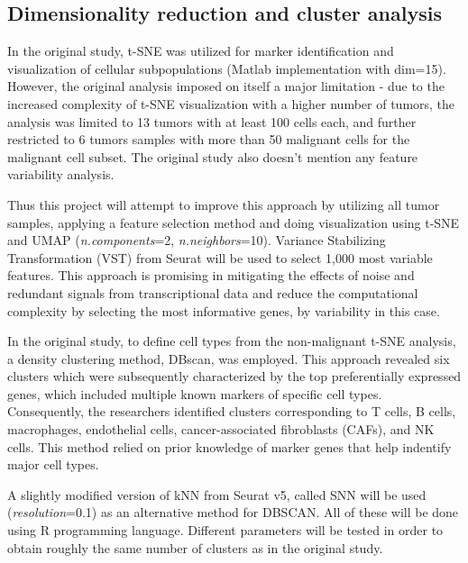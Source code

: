 \documentclass[11pt]{article}
\begin{document}
\subsection{Dimensionality reduction and cluster analysis}
\begin{multicols}{2}
    \noindent
    In the original study, t-SNE was utilized for marker identification and visualization of cellular subpopulations (Matlab implementation with dim=15). However, the original analysis imposed on itself a major limitation - due to the increased complexity of t-SNE visualization with a higher number of tumors, the analysis was limited to 13 tumors with at least 100 cells each, and further restricted to 6 tumors samples with more than 50 malignant cells for the malignant cell subset. The original study also doesn't mention any feature variability analysis.

    Thus this project will attempt to improve this approach by utilizing all tumor samples, applying a feature selection method and doing visualization using t-SNE and UMAP (\textit{n.components}=2, \textit{n.neighbors}=10). Variance Stabilizing Transformation (VST) from Seurat\cite{hao_dictionary_2024} will be used to select 1,000 most variable features. This approach is promising in mitigating the effects of noise and redundant signals from transcriptional data and reduce the computational complexity by selecting the most informative genes, by variability in this case.
    
    In the original study, to define cell types from the non-malignant t-SNE analysis, a density clustering method, DBscan, was employed. This approach revealed six clusters which were subsequently characterized by the top preferentially expressed genes, which included multiple known markers of specific cell types. Consequently, the researchers identified clusters corresponding to T cells, B cells, macrophages, endothelial cells, cancer-associated fibroblasts (CAFs), and NK cells. This method relied on prior knowledge of marker genes that help indentify major cell types.

    A slightly modified version of kNN from Seurat v5\cite{hao_dictionary_2024}, called SNN will be used (\textit{resolution}=0.1) as an alternative method for DBSCAN. All of these will be done using R programming language. Different parameters will be tested in order to obtain roughly the same number of clusters as in the original study.
    
\end{multicols}
\end{document}

